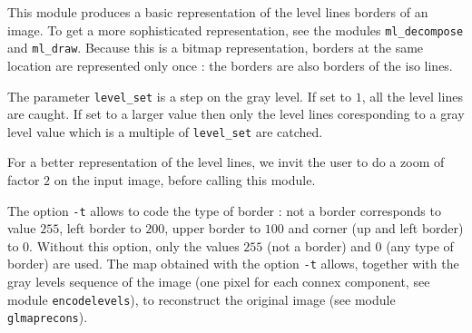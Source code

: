 This module produces a basic representation of the level lines 
borders of an 
image. To get a more sophisticated representation, see the modules 
\verb+ml_decompose+ and \verb+ml_draw+.
Because this is a bitmap representation, borders at the same location are
represented only once : the borders are also borders of the iso lines.

The parameter \verb+level_set+ is a step on the gray level. If set to $1$, 
all the level lines are caught. If set to a larger value then only the
level lines coresponding to a gray level value which is a multiple of  
\verb+level_set+ are catched.

For a better representation of the level lines, we invit the user to 
do a zoom of factor $2$ on the input image, before calling this module.

The option \verb+-t+ allows to code the type of border : not a border 
corresponds to value $255$, left border to $200$, upper border to $100$ 
and corner (up and left border) to $0$. Without this option, only the
values $255$ (not a border) and $0$ (any type of border) are used.
The map obtained with the option \verb+-t+ allows, together with the
gray levels sequence of the image (one pixel for each connex component,
see module \verb+encodelevels+), to reconstruct the original image
(see module \verb+glmaprecons+).
